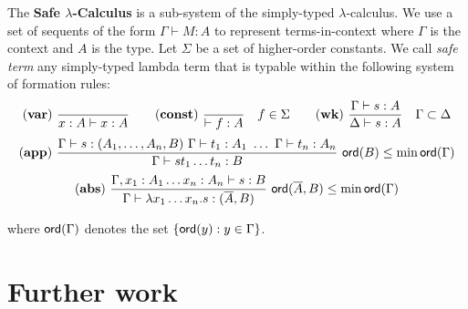\documentclass{llncs}
\newcommand\ord[1]{{\sf ord}(#1)}
\newcommand{\rulename}[1]{\mathbf{(#1)}}
\newcommand\dps{\displaystyle}
\newcommand\rulef[2]{\frac{\dps #1}{#2}}
\begin{document}
The \textbf{Safe $\lambda$-Calculus} is a sub-system of the
simply-typed $\lambda$-calculus. 
We use a set of sequents of the form $\Gamma \vdash M : A$ to represent
terms-in-context where $\Gamma$ is the context and $A$ is the type. Let
$\Sigma$ be a set of higher-order constants. We call \emph{safe term} any
simply-typed lambda term that is typable within the following system
of formation rules:
$$ \rulename{var} \   \rulef{}{x : A\vdash x : A}
\qquad  \rulename{const} \   \rulef{}{\vdash f : A} \quad f \in \Sigma
\qquad  \rulename{wk} \   \rulef{\Gamma \vdash s : A}{\Delta \vdash s : A} \quad \Gamma \subset \Delta$$
$$ \rulename{app} \  \rulef{\Gamma \vdash s : (A_1,\ldots,A_n,B)
                                        \ \Gamma \vdash t_1 : A_1
                                        \  \ldots\  \Gamma \vdash t_n : A_n }
                                   {\Gamma  \vdash s t_1 \ldots t_n : B}
                                    \ 
                                   \ord{B} \leq \min \ord{\Gamma}$$
$$ \rulename{abs} \   \rulef{\Gamma, x_1 : A_1 \ldots x_n : A_n \vdash s : B}
                                   {\Gamma  \vdash \lambda x_1 \ldots x_n . s : (\overline{A},B)} \
                                   \ord{\overline{A},B} \leq \min \ord{\Gamma}$$

where $\ord{\Gamma}$ denotes the set $\{ \ord{y} : y \in \Gamma \}$.




\section{Further work}
\end{document}
